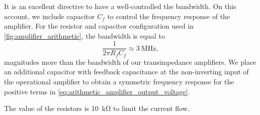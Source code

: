 It is an excellent directive to have a well-controlled the bandwidth.
On this account, we include capacitor $C_f$ to control the frequency response of the amplifier. 
For the resistor and capacitor configuration used in \cref{fig:amplifier_arithmetic}, the bandwidth is equal to
\begin{equation}
	\frac{1}{2\pi R_fC_f}\approx\SI{3}{\mega\hertz},
\end{equation}
magnitudes more than the bandwidth of our transimpedance amplifiers.
We place an additional capacitor with feedback capacitance at the non-inverting input of the operational amplifier to obtain a symmetric frequency response for the positive terms in \eqref{eq:arithmetic_amplifier_output_voltage}.

The value of the resistors is \SI{10}{\kilo\ohm} to limit the current flow.

